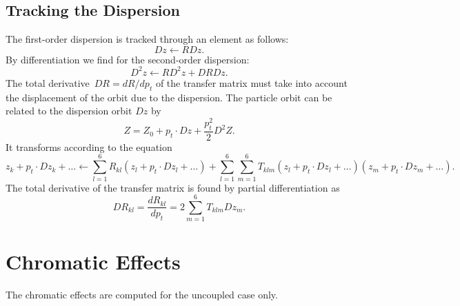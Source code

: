 \subsection{Tracking the Dispersion}
\label{deriveR}
The first-order dispersion is tracked through an element as follows:
\begin{equation}
Dz \leftarrow R Dz.
\end{equation}
By differentiation we find for the second-order dispersion:
\begin{equation}
D^2z \leftarrow R D^2z + DR Dz.
\end{equation}
The total derivative~$DR=dR/dp_t$ of the transfer matrix must take
into account the displacement of the orbit due to the dispersion.
The particle orbit can be related to the dispersion orbit $Dz$ by
\begin{equation}
Z = Z_0 + p_t\cdot Dz + \frac{p_t^2}{2} D^2Z.
\end{equation}
It transforms according to the equation
\begin{equation}
z_k+p_t\cdot Dz_k+\ldots\leftarrow
  \sum_{l=1}^6 R_{kl} (z_l+p_t\cdot Dz_l+\ldots) +
  \sum_{l=1}^6 \sum_{m=1}^6 T_{klm}
    (z_l+p_t\cdot Dz_l+\ldots)(z_m+p_t\cdot Dz_m+\ldots).
\end{equation}
The total derivative of the transfer matrix is found by partial
differentiation as
\begin{equation}
DR_{kl} = \frac{dR_{kl}}{dp_t} = 2 \sum_{m=1}^6 T_{klm} Dz_m.
\end{equation}
 
 
\section{Chromatic Effects}
The chromatic effects are computed for the uncoupled case only.
 
